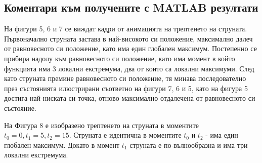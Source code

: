 \documentclass[14pt]{extarticle}
\begin{document}
\subsection{Коментари към получените с MATLAB резултати}
\hspace{7mm}На фигури 5, 6 и 7 се виждат кадри от анимацията на трептенето на струната.
Първоначално струната застава в най-високото си положение, максимално далеч от равновесното си положение, като има един глобален максимум. Постепенно се прибира надолу към равновесното си положение, като има момент в който функцията има 3 локални екстремума, два от които са локални максимуми. След като струната премине равновесното си положение, тя минава последователно през състоянията илюстрирани съответно на фигури 7, 6 и 5, като на фигура 5 достига най-ниската си точка, отново максимално отдалечена от равновесното си състояние.

На Фигура 8 е изобразено трептенето на струната в моментите $t_0 = 0, t_1 = 5, t_2 = 15$. Струната е идентична в моментите $t_0$ и $t_2$ - има един глобален максимум. Докато в момент $t_1$ струната е по-вълнообразна и има три локални екстремума.
\end{document}

